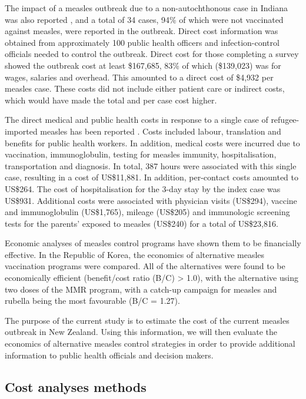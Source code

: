 \documentclass{article}
\begin{document}
The impact of a measles outbreak due to a non-autochthonous case in Indiana was also reported \citep{parker6}, and a total of 34 cases, 94\% of which were not vaccinated against measles, were reported in the outbreak. Direct cost information was obtained from approximately 100 public health officers and infection-control officials needed to control the outbreak. Direct cost for those completing a survey showed the outbreak cost at least \$167,685, 83\% of which (\$139,023) was for wages, salaries and overhead. This amounted to a direct cost of \$4,932 per measles case. These costs did not include either patient care or indirect costs, which would have made the total and per case cost higher.

The direct medical and public health costs in response to a single case of refugee-imported measles has been reported \citep{coleman12}.  Costs included labour, translation and benefits for public health workers. In addition, medical costs were incurred due to vaccination, immunoglobulin, testing for measles immunity, hospitalisation, transportation and diagnosis. In total, 387 hours were associated with this single case, resulting in a cost of US\$11,881. In addition, per-contact costs amounted to US\$264. The cost of hospitalisation for the 3-day stay by the index case was US\$931. Additional costs were associated with physician visits (US\$294), vaccine and immunoglobulin (US\$1,765), mileage (US\$205) and immunologic screening tests for the parents' exposed to measles (US\$240) for a total of US\$23,816.

Economic analyses of measles control programs have shown them to be financially effective. In the Republic of Korea, the economics of alternative measles vaccination programs were compared. All of the alternatives were found to be economically efficient (benefit/cost ratio (B/C) > 1.0), with the alternative using two doses of the MMR program, with a catch-up campaign for measles and rubella being the most favourable (B/C = 1.27).

The purpose of the current study is to estimate the cost of the current measles outbreak in New Zealand. Using this information, we will then evaluate the economics of alternative measles control strategies in order to provide additional information to public health officials and decision makers.

\subsection{Cost analyses methods}
\label{sub:cost}
\end{document}
